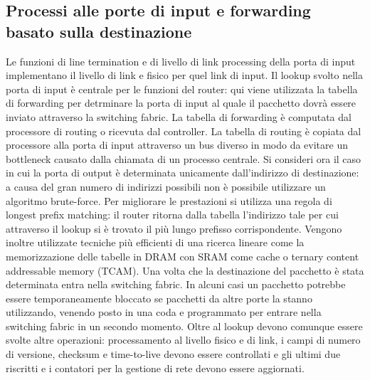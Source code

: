 \subsection{Processi alle porte di input e forwarding basato sulla destinazione}
Le funzioni di line termination e di livello di link processing della porta di input implementano il livello di link e fisico per quel link di input. Il 
lookup svolto nella porta di input \`e centrale per le funzioni del router: qui viene utilizzata la tabella di forwarding per detrminare la porta di input
al quale il pacchetto dovr\`a essere inviato attraverso la switching fabric. La tabella di forwarding \`e computata dal processore di routing o ricevuta dal
controller. La tabella di routing \`e copiata dal processore alla porta di input attraverso un bus diverso in modo da evitare un bottleneck causato dalla
chiamata di un processo centrale. Si consideri ora il caso in cui la porta di output \`e determinata unicamente dall'indirizzo di destinazione: a causa
del gran numero di indirizzi possibili non \`e possibile utilizzare un algoritmo brute-force. Per migliorare le prestazioni si utilizza una regola di 
longest prefix matching: il router ritorna dalla tabella l'indirizzo tale per cui attraverso il lookup si \`e trovato il pi\`u lungo prefisso 
corrispondente. Vengono inoltre utilizzate tecniche pi\`u efficienti di una ricerca lineare come la memorizzazione delle tabelle in DRAM con SRAM come
cache o ternary content addressable memory (TCAM). Una volta che la destinazione del pacchetto \`e stata determinata entra nella switching fabric. In alcuni
casi un pacchetto potrebbe essere temporaneamente bloccato se pacchetti da altre porte la stanno utilizzando, venendo posto in una coda e programmato per
entrare nella switching fabric in un secondo momento. Oltre al lookup devono comunque essere svolte altre operazioni: processamento al livello fisico e di
link, i campi di numero di versione, checksum e time-to-live devono essere controllati e gli ultimi due riscritti e i contatori per la gestione di rete 
devono essere aggiornati.
